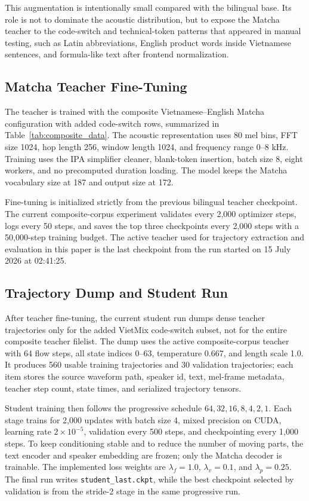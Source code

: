 \documentclass[10pt,twoside]{article}
\begin{document}
This augmentation is intentionally small compared with the bilingual base. Its
role is not to dominate the acoustic distribution, but to expose the Matcha
teacher to the code-switch and technical-token patterns that appeared in manual
testing, such as Latin abbreviations, English product words inside Vietnamese
sentences, and formula-like text after frontend normalization.

\subsection{Matcha Teacher Fine-Tuning}

The teacher is trained with the composite Vietnamese--English Matcha
configuration with added code-switch rows, summarized in
Table~\ref{tab:composite_data}. The acoustic
representation uses 80 mel bins, FFT size 1024, hop length 256, window length
1024, and frequency range 0--8 kHz. Training uses the IPA simplifier cleaner,
blank-token insertion, batch size 8, eight workers, and no precomputed duration
loading. The model keeps the Matcha vocabulary size at 187 and output size at
172.

Fine-tuning is initialized strictly from the previous bilingual teacher
checkpoint. The current composite-corpus experiment validates every 2,000
optimizer steps, logs every 50 steps, and saves the top three checkpoints every
2,000 steps with a 50,000-step training budget. The active teacher used for
trajectory extraction and evaluation in this paper is the last checkpoint from
the run started on 15 July 2026 at 02:41:25.

\subsection{Trajectory Dump and Student Run}

After teacher fine-tuning, the current student run dumps dense teacher
trajectories only for the added VietMix code-switch subset, not for the entire
composite teacher filelist. The dump uses the active composite-corpus teacher
with 64 flow steps, all state indices 0--63, temperature 0.667, and length scale
1.0. It produces 560 usable training trajectories and 30 validation
trajectories; each item stores the source waveform path, speaker id, text,
mel-frame metadata, teacher step count, state times, and serialized trajectory
tensors.

Student training then follows the progressive schedule
$64,32,16,8,4,2,1$. Each stage trains for 2,000 updates with batch size 4,
mixed precision on CUDA, learning rate $2\times 10^{-5}$, validation every 500
steps, and checkpointing every 1,000 steps. To keep conditioning stable and to
reduce the number of moving parts, the text encoder and speaker embedding are
frozen; only the Matcha decoder is trainable. The implemented loss weights are
$\lambda_f=1.0$, $\lambda_v=0.1$, and $\lambda_p=0.25$. The final run writes
\texttt{student\_last.ckpt}, while the best checkpoint selected by validation is
from the stride-2 stage in the same progressive run.
\end{document}
